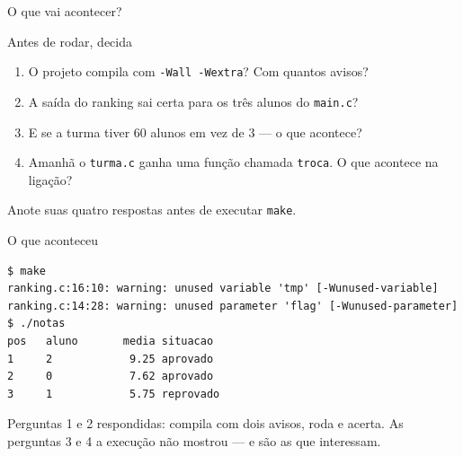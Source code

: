 \documentclass[aspectratio=169]{beamer}
\begin{document}
\begin{frame}{O que vai acontecer?}
  \begin{block}{Antes de rodar, decida}
    \begin{enumerate}
      \item O projeto compila com \texttt{-Wall -Wextra}? Com quantos avisos?
      \item A saída do ranking sai certa para os três alunos do
        \texttt{main.c}?
      \item E se a turma tiver 60 alunos em vez de 3 --- o que acontece?
      \item Amanhã o \texttt{turma.c} ganha uma função chamada
        \texttt{troca}. O que acontece na ligação?
    \end{enumerate}
  \end{block}
  \begin{exampleblock}{}
    Anote suas quatro respostas antes de executar \texttt{make}.
  \end{exampleblock}
\end{frame}

\begin{frame}[fragile]{O que aconteceu}
\begin{lstlisting}[style=shellStyle]
$ make
ranking.c:16:10: warning: unused variable 'tmp' [-Wunused-variable]
ranking.c:14:28: warning: unused parameter 'flag' [-Wunused-parameter]
$ ./notas
pos   aluno       media situacao
1     2            9.25 aprovado
2     0            7.62 aprovado
3     1            5.75 reprovado
\end{lstlisting}
  \begin{block}{}
    \small Perguntas 1 e 2 respondidas: compila com dois avisos, roda e
    acerta. As perguntas 3 e 4 a execução não mostrou --- e são as que
    interessam.
  \end{block}
\end{frame}
\end{document}
